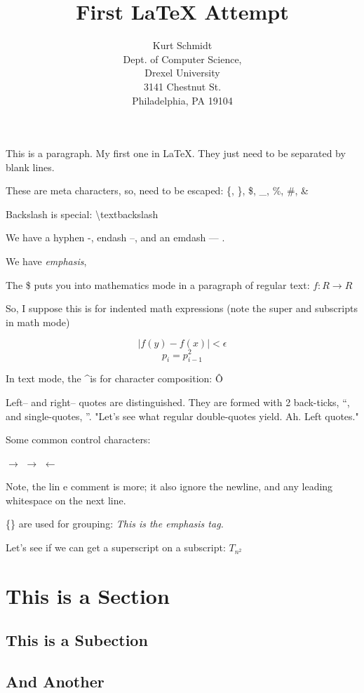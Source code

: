 \documentclass[a4paper,12pt,titlepage]{article}
\title{First LaTeX Attempt}
\author{Kurt Schmidt\\
  Dept. of Computer Science,\\
  Drexel University\\
  3141 Chestnut St.\\
  Philadelphia, PA  19104}
\begin{document}
\maketitle

%

This is a paragraph.  My first one in \LaTeX.  They just need to be
separated by blank lines.

These are meta characters, so, need to be escaped:  \{, \}, \$, \_,
\%, \#, \& 

Backslash is special:  \textbackslash{}textbackslash

We have a hyphen -, endash --, and an emdash --- .

We have \emph{emphasis},

The \$ puts you into mathematics mode in a paragraph of regular text:  
$ f: R \to R $

So, I suppose this is for indented math expressions (note the super and
subscripts in math mode)

\[ |f(y) - f(x)| < \epsilon \]
\[ p_{i} = p_{i-1}^2 \]

In text mode, the \textasciicircum is for character composition: \^O

Left-- and right-- quotes are distinguished.  They are formed with 2
back-ticks, ``, and single-quotes, ''.  "Let's see what regular
double-quotes yield.  Ah.  Left quotes."

Some common control characters:

$\to$
$\rightarrow$
$\leftarrow$

Note, the lin%
		 	   e comment is more; it also ignore the newline, and any leading
whitespace on the next line.

\{\} are used for grouping:  \emph{This is the emphasis tag.}

Let's see if we can get a superscript on a subscript:  $T_{n^2}$

\section{This is a Section}
\subsection{This is a Subection}
\subsection{And Another}
\end{document}
